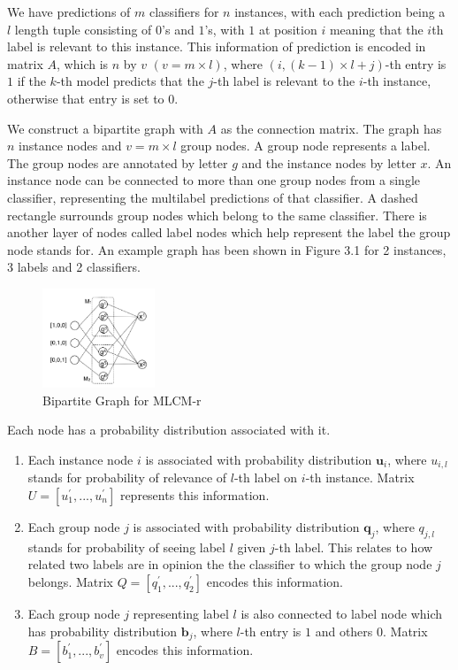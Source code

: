 \documentclass[12pt]{report}
\begin{document}
We have predictions of $m$ classifiers for $n$ instances, with each prediction being a $l$ length tuple consisting of $0$'s and $1$'s, with $1$ at position $i$ meaning that the $i$th label is relevant to this instance. This information of prediction is encoded in matrix $A$, which is $n$ by $v$  $(v=m\times l)$, where $(i, (k - 1) \times l + j)$-th entry is $1$ if the $k$-th model predicts that the $j$-th label is relevant to the $i$-th instance, otherwise that entry is set to $0$. 

We construct a bipartite graph with $A$ as the connection matrix. The graph has $n$ instance nodes and $v = m \times l$ group nodes. A group node represents a label. The group nodes are annotated by letter $g$ and the instance nodes by letter $x$. An instance node can be connected to more than one group nodes from a single classifier, representing the multilabel predictions of that classifier. A dashed rectangle surrounds group nodes which belong to the same classifier. There is another layer of nodes called label nodes which help represent the label the group node stands for. An example graph has been shown in Figure 3.1 for 2 instances, 3 labels and 2 classifiers. 
\pagebreak

\begin{figure}[h!]
\centering
\includegraphics[width=0.3\textwidth]{MLCMgraph.png}
\caption{Bipartite Graph for MLCM-r\cite{MLCM}}
\end{figure}

Each node has a probability distribution associated with it. 
\begin{enumerate}
\item Each instance node $i$ is associated with probability distribution $\boldsymbol{u}_i$, where $u_{i, l}$ stands for probability of relevance of $l$-th label on $i$-th instance. Matrix $U=[u_1^{'},...,u_n^{'}]$ represents this information. 
\item Each group node $j$ is associated with probability distribution $\boldsymbol{q}_j$, where $q_{j, l}$ stands for probability of seeing label $l$ given $j$-th label. This relates to how related two labels are in opinion the the classifier to which the group node $j$ belongs. Matrix $Q = [q_1^{'},...,q_2^{'}]$ encodes this information.
\item Each group node $j$ representing label $l$ is also connected to label node which has probability distribution $\boldsymbol{b}_j$, where $l$-th entry is $1$ and others 0. Matrix $B = [b_1^{'},...,b_v^{'}]$ encodes this information.
\end{enumerate}
\end{document}
